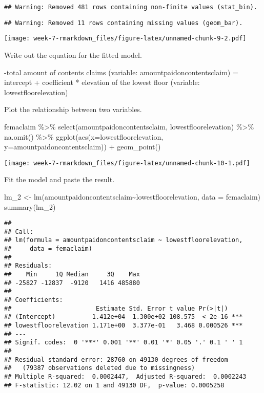 \documentclass[
]{article}
\newenvironment{Shaded}{\begin{snugshade}}{\end{snugshade}}
\newcommand{\AttributeTok}[1]{\textcolor[rgb]{0.77,0.63,0.00}{#1}}
\newcommand{\FunctionTok}[1]{\textcolor[rgb]{0.00,0.00,0.00}{#1}}
\newcommand{\NormalTok}[1]{#1}
\newcommand{\OtherTok}[1]{\textcolor[rgb]{0.56,0.35,0.01}{#1}}
\newcommand{\SpecialCharTok}[1]{\textcolor[rgb]{0.00,0.00,0.00}{#1}}
\begin{document}
\begin{verbatim}
## Warning: Removed 481 rows containing non-finite values (stat_bin).
\end{verbatim}

\begin{verbatim}
## Warning: Removed 11 rows containing missing values (geom_bar).
\end{verbatim}

\texttt{[image: week-7-rmarkdown\_files/figure-latex/unnamed-chunk-9-2.pdf]}

Write out the equation for the fitted model.

-total amount of contents claims (variable: amountpaidoncontentsclaim) =
intercept + coefficient * elevation of the lowest floor (variable:
lowestfloorelevation)

Plot the relationship between two variables.

\begin{Shaded}
\begin{Highlighting}[]
\NormalTok{femaclaim }\SpecialCharTok{\%\textgreater{}\%}
  \FunctionTok{select}\NormalTok{(amountpaidoncontentsclaim, lowestfloorelevation) }\SpecialCharTok{\%\textgreater{}\%}
  \FunctionTok{na.omit}\NormalTok{() }\SpecialCharTok{\%\textgreater{}\%}
  \FunctionTok{ggplot}\NormalTok{(}\FunctionTok{aes}\NormalTok{(}\AttributeTok{x=}\NormalTok{lowestfloorelevation, }\AttributeTok{y=}\NormalTok{amountpaidoncontentsclaim)) }\SpecialCharTok{+} \FunctionTok{geom\_point}\NormalTok{()}
\end{Highlighting}
\end{Shaded}

\texttt{[image: week-7-rmarkdown\_files/figure-latex/unnamed-chunk-10-1.pdf]}

Fit the model and paste the result.

\begin{Shaded}
\begin{Highlighting}[]
\NormalTok{lm\_2 }\OtherTok{\textless{}{-}} \FunctionTok{lm}\NormalTok{(amountpaidoncontentsclaim}\SpecialCharTok{\textasciitilde{}}\NormalTok{lowestfloorelevation, }\AttributeTok{data =}\NormalTok{ femaclaim)}
\FunctionTok{summary}\NormalTok{(lm\_2)}
\end{Highlighting}
\end{Shaded}

\begin{verbatim}
## 
## Call:
## lm(formula = amountpaidoncontentsclaim ~ lowestfloorelevation, 
##     data = femaclaim)
## 
## Residuals:
##    Min     1Q Median     3Q    Max 
## -25827 -12837  -9120   1416 485880 
## 
## Coefficients:
##                       Estimate Std. Error t value Pr(>|t|)    
## (Intercept)          1.412e+04  1.300e+02 108.575  < 2e-16 ***
## lowestfloorelevation 1.171e+00  3.377e-01   3.468 0.000526 ***
## ---
## Signif. codes:  0 '***' 0.001 '**' 0.01 '*' 0.05 '.' 0.1 ' ' 1
## 
## Residual standard error: 28760 on 49130 degrees of freedom
##   (79387 observations deleted due to missingness)
## Multiple R-squared:  0.0002447,  Adjusted R-squared:  0.0002243 
## F-statistic: 12.02 on 1 and 49130 DF,  p-value: 0.0005258
\end{verbatim}
\end{document}

